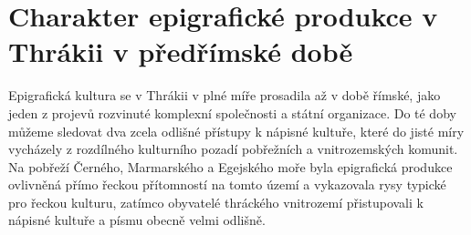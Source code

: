 
\section[charakter-epigrafické-produkce-v-thrákii-v-předřímské-době]{Charakter epigrafické produkce v Thrákii v předřímské době}

Epigrafická kultura se v Thrákii v plné míře prosadila až v době římské, jako jeden z projevů rozvinuté komplexní společnosti a státní organizace. Do té doby můžeme sledovat dva zcela odlišné přístupy k nápisné kultuře, které do jisté míry vycházely z rozdílného kulturního pozadí pobřežních a vnitrozemských komunit. Na pobřeží Černého, Marmarského a Egejského moře byla epigrafická produkce ovlivněná přímo řeckou přítomností na tomto území a vykazovala rysy typické pro řeckou kulturu, zatímco obyvatelé thráckého vnitrozemí přistupovali k nápisné kultuře a písmu obecně velmi odlišně.

